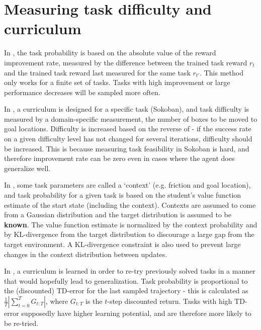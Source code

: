 \documentclass[letterpaper]{article}
\theoremstyle{definition}
\begin{document}
\section{Measuring task difficulty and curriculum} \label{sec:difficulty}

In \cite{Matiisen2020}, the task probability is based on the absolute value of the reward improvement rate, measured by the difference between the trained task reward $r_t$ and the trained task reward last measured for the same task $r_{t'}$.
This method only works for a finite set of tasks. Tasks with high improvement or large performance decreases will be sampled more often.

In \cite{Feng2020}, a curriculum is designed for a specific task (Sokoban), and task difficulty is measured by a domain-specific measurement, the number of boxes to be moved to goal locations. Difficulty is increased based on the reverse of \cite{Matiisen2020} - if the success rate on a given difficulty level has not changed for several iterations, difficulty should be increased. This is because measuring task feasibility in Sokoban is hard, and therefore improvement rate can be zero even in cases where the agent does generalize well.

In \cite{Klink2020}, some task parameters are called a `context' (e.g. friction and goal location), and task probability for a given task is based on the student's value function estimate of the start state (including the context).
Contexts are assumed to come from a Gaussian distribution and the target distribution is assumed to be \textbf{known}.
The value function estimate is normalized by the context probability and by KL-divergence from the target distribution to discourage a large gap from the target environment. A KL-divergence constraint is also used to prevent large changes in the context distribution between updates.

In \cite{Jiang2020}, a curriculum is learned in order to re-try previously solved tasks in a manner that would hopefully lead to generalization. Task probability is proportional to the (discounted) TD-error for the last sampled trajectory - this is calculated as $ \frac{1}{T} | \sum_{t=0}^{T} {G_{t:T}}|$, where $G_{t:T}$ is the $t$-step discounted return. Tasks with high TD-error supposedly have higher learning potential, and are therefore more likely to be re-tried. 
\end{document}
